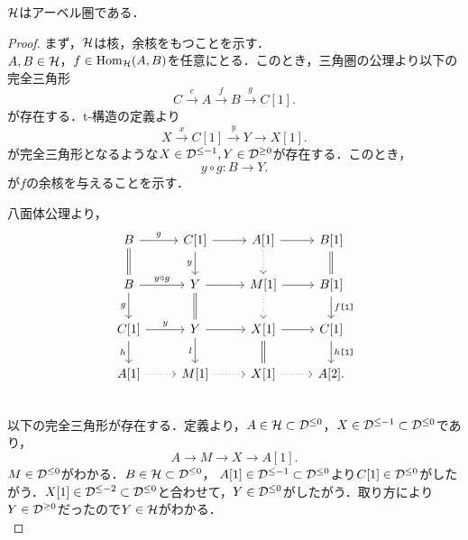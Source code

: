 \begin{prop}\cite[p.33]{BBD}
	${\mathcal H}$はアーベル圏である．
\end{prop}
\begin{proof}
	まず，${\mathcal H}$は核，余核をもつことを示す．\\
	$A,B\in{\mathcal H}$，$f\in\operatorname{\mathrm{Hom}}_{{\mathcal H}}(A,B)$を任意にとる．このとき，三角圏の公理より以下の完全三角形
	\[C\xrightarrow{e}A\xrightarrow{f}B\xrightarrow{g}C[1].\]
	が存在する．t-構造の定義より
	\[X\xrightarrow{x}C[1]\xrightarrow{y}Y\rightarrow X[1].\]
	が完全三角形となるような$X\in {\mathcal D}^{\le -1},Y\in {\mathcal D}^{\ge 0}$が存在する．このとき，
	\[y\circ g\colon B\rightarrow Y.\]
	が$f$の余核を与えることを示す．
	\begin{comment}
			\[
				\begin{tikzcd}[column sep=huge,row sep =huge]
					B[-1] \ar[r,"g\texttt{[-1]}"]\ar[d,equal]& C\ar[r,]\ar[d,"y\texttt{[-1]}",swap]& A\ar[d,"\ell",dotted] \ar[r,"f"]& B\ar[d,equal]\\
					B[-1] \ar[r,"y\texttt{[-1]}\circ g\texttt{[-1]}"]\ar[d,"g\texttt{[-1]}",swap]& Y[-1]\ar[r,]\ar[d,equal]& M\ar[d,dotted] \ar[r,"m"]& B\ar[d,"g"]\\
					C \ar[r,]\ar[d,swap]& Y[-1]\ar[r,]\ar[d,swap]& X \ar[r,"x"]\ar[d,equal]& C[1] \ar[d,]\\
			A \ar[r,"\ell",dotted]& M\ar[r,dotted]&  X\ar[r,dotted]& A[1]\\
		\end{tikzcd}
			\]
\end{comment}	
八面体公理より，
			\[
		\begin{tikzcd}
			B \ar[r,"g"]\ar[d,equal]& C[1]\ar[r,]\ar[d,"y",swap]& A[1]\ar[d,dotted] \ar[r]& B[1]\ar[d,equal]\\
			B \ar[r,"y\circ g"]\ar[d,"g",swap]& Y\ar[r]\ar[d,equal]& M[1]\ar[d,dotted] \ar[r]& B[1]\ar[d,"f\texttt{[1]}"]\\
			C[1] \ar[r,"y"]\ar[d,"h",swap]& Y\ar[r]\ar[d,"l",swap]& X[1] \ar[r]\ar[d,equal]& C[1]\ar[d,"h\texttt{[1]}"]\\
			A[1] \ar[r,dotted]& M[1]\ar[r,dotted]& X[1] \ar[r,dotted]& A[2].\\
		\end{tikzcd}
			\]
以下の完全三角形が存在する．定義より，$A\in{\mathcal H}\subset{\mathcal D}^{\le 0}$，$X\in{\mathcal D}^{\le -1}\subset{\mathcal D}^{\le 0}$であり，
	\[A\rightarrow M\rightarrow X\rightarrow A[1].\]
	$M\in{\mathcal D}^{\le 0}$がわかる．$B\in{\mathcal H}\subset{\mathcal D}^{\le 0}$， $A[1]\in {\mathcal D}^{\le -1}\subset {\mathcal D}^{\le 0}$より$C[1]\in{\mathcal D}^{\le 0}$がしたがう．$X[1]\in{\mathcal D}^{\le -2}\subset{\mathcal D}^{\le 0}$と合わせて，$Y\in{\mathcal D}^{\le 0}$がしたがう．取り方により$Y\in{\mathcal D}^{\ge 0}$だったので$Y\in{\mathcal H}$がわかる．\\

\end{proof}
